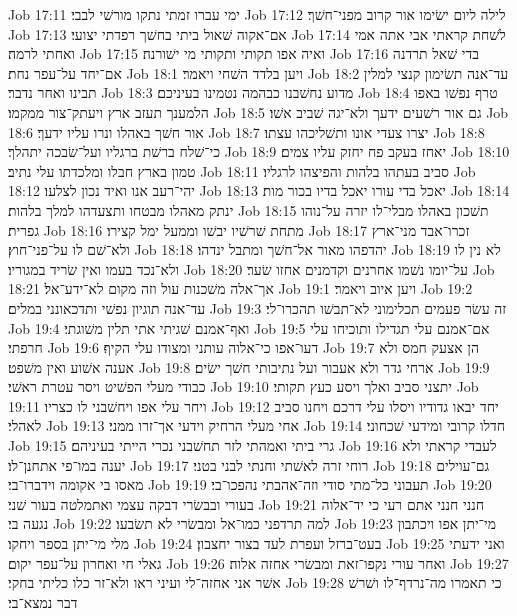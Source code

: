 Job 17:11  ימי עברו זמתי נתקו מורשׁי לבבי׃
Job 17:12  לילה ליום ישׂימו אור קרוב מפני־חשׁך׃
Job 17:13  אם־אקוה שׁאול ביתי בחשׁך רפדתי יצועי׃
Job 17:14  לשׁחת קראתי אבי אתה אמי ואחתי לרמה׃
Job 17:15  ואיה אפו תקותי ותקותי מי ישׁורנה׃
Job 17:16  בדי שׁאל תרדנה אם־יחד על־עפר נחת׃
Job 18:1  ויען בלדד השׁחי ויאמר׃
Job 18:2  עד־אנה תשׂימון קנצי למלין תבינו ואחר נדבר׃
Job 18:3  מדוע נחשׁבנו כבהמה נטמינו בעיניכם׃
Job 18:4  טרף נפשׁו באפו הלמענך תעזב ארץ ויעתק־צור ממקמו׃
Job 18:5  גם אור רשׁעים ידעך ולא־יגה שׁביב אשׁו׃
Job 18:6  אור חשׁך באהלו ונרו עליו ידעך׃
Job 18:7  יצרו צעדי אונו ותשׁליכהו עצתו׃
Job 18:8  כי־שׁלח ברשׁת ברגליו ועל־שׂבכה יתהלך׃
Job 18:9  יאחז בעקב פח יחזק עליו צמים׃
Job 18:10  טמון בארץ חבלו ומלכדתו עלי נתיב׃
Job 18:11  סביב בעתהו בלהות והפיצהו לרגליו׃
Job 18:12  יהי־רעב אנו ואיד נכון לצלעו׃
Job 18:13  יאכל בדי עורו יאכל בדיו בכור מות׃
Job 18:14  ינתק מאהלו מבטחו ותצעדהו למלך בלהות׃
Job 18:15  תשׁכון באהלו מבלי־לו יזרה על־נוהו גפרית׃
Job 18:16  מתחת שׁרשׁיו יבשׁו וממעל ימל קצירו׃
Job 18:17  זכרו־אבד מני־ארץ ולא־שׁם לו על־פני־חוץ׃
Job 18:18  יהדפהו מאור אל־חשׁך ומתבל ינדהו׃
Job 18:19  לא נין לו ולא־נכד בעמו ואין שׂריד במגוריו׃
Job 18:20  על־יומו נשׁמו אחרנים וקדמנים אחזו שׂער׃
Job 18:21  אך־אלה משׁכנות עול וזה מקום לא־ידע־אל׃
Job 19:1  ויען איוב ויאמר׃
Job 19:2  עד־אנה תוגיון נפשׁי ותדכאונני במלים׃
Job 19:3  זה עשׂר פעמים תכלימוני לא־תבשׁו תהכרו־לי׃
Job 19:4  ואף־אמנם שׁגיתי אתי תלין משׁוגתי׃
Job 19:5  אם־אמנם עלי תגדילו ותוכיחו עלי חרפתי׃
Job 19:6  דעו־אפו כי־אלוה עותני ומצודו עלי הקיף׃
Job 19:7  הן אצעק חמס ולא אענה אשׁוע ואין משׁפט׃
Job 19:8  ארחי גדר ולא אעבור ועל נתיבותי חשׁך ישׂים׃
Job 19:9  כבודי מעלי הפשׁיט ויסר עטרת ראשׁי׃
Job 19:10  יתצני סביב ואלך ויסע כעץ תקותי׃
Job 19:11  ויחר עלי אפו ויחשׁבני לו כצריו׃
Job 19:12  יחד יבאו גדודיו ויסלו עלי דרכם ויחנו סביב לאהלי׃
Job 19:13  אחי מעלי הרחיק וידעי אך־זרו ממני׃
Job 19:14  חדלו קרובי ומידעי שׁכחוני׃
Job 19:15  גרי ביתי ואמהתי לזר תחשׁבני נכרי הייתי בעיניהם׃
Job 19:16  לעבדי קראתי ולא יענה במו־פי אתחנן־לו׃
Job 19:17  רוחי זרה לאשׁתי וחנתי לבני בטני׃
Job 19:18  גם־עוילים מאסו בי אקומה וידברו־בי׃
Job 19:19  תעבוני כל־מתי סודי וזה־אהבתי נהפכו־בי׃
Job 19:20  בעורי ובבשׂרי דבקה עצמי ואתמלטה בעור שׁני׃
Job 19:21  חנני חנני אתם רעי כי יד־אלוה נגעה בי׃
Job 19:22  למה תרדפני כמו־אל ומבשׂרי לא תשׂבעו׃
Job 19:23  מי־יתן אפו ויכתבון מלי מי־יתן בספר ויחקו׃
Job 19:24  בעט־ברזל ועפרת לעד בצור יחצבון׃
Job 19:25  ואני ידעתי גאלי חי ואחרון על־עפר יקום׃
Job 19:26  ואחר עורי נקפו־זאת ומבשׂרי אחזה אלוה׃
Job 19:27  אשׁר אני אחזה־לי ועיני ראו ולא־זר כלו כליתי בחקי׃
Job 19:28  כי תאמרו מה־נרדף־לו ושׁרשׁ דבר נמצא־בי׃

